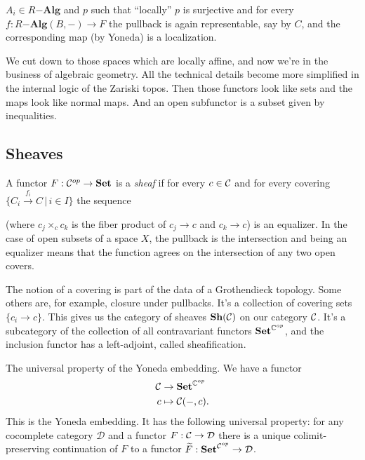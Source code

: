 \documentclass[class=report, crop=false,a4paper,twoside]{standalone}
\begin{document}
$A_i \in R\mathbf{-Alg}$ and $p$ such that ``locally'' $p$ is surjective and for every $f: R\mathbf{-Alg}(B,-) \to F$ the pullback is again representable, say by $C$, and the corresponding map (by Yoneda) is a localization.

We cut down to those spaces which are locally affine, and now we're in the business of algebraic geometry. All the technical details become more simplified in the internal logic of the Zariski topos. Then those functors look like sets and the maps look like normal maps. And an open subfunctor is a subset given by inequalities.

\subsection{Sheaves}
A functor $F: \mathcal{C}^{op} \to \mathbf{Set}$ is a \emph{sheaf} if for every $c \in \mathcal{C}$ and for every covering $\{C_i \xrightarrow{f_i} C \,|\, i \in I\}$ the sequence
\begin{center}
	(where $c_j \times_c c_k$ is the fiber product of $c_j \to c$ and $c_k \to c$) is an equalizer. In the case of open subsets of a space $X$, the pullback is the intersection and being an equalizer means that the function agrees on the intersection of any two open covers. 
\end{center}

The notion of a covering is part of the data of a Grothendieck topology. Some others are, for example, closure under pullbacks. It's a collection of covering sets $\{c_i \to c\}$. This gives us the category of sheaves $\mathbf{Sh}(\mathcal{C})$ on our category $\mathcal{C}$. It's a subcategory of the collection of all contravariant functors $\mathbf{Set}^{\mathbb{C}^{op}}$, and the inclusion functor has a left-adjoint, called sheafification.

The universal property of the Yoneda embedding. We have a functor
\begin{align*}
	\mathcal{C} &\to \mathbf{Set}^{\mathbb{C}^{op}}\\
	c &\mapsto \mathcal{C}(-,c).
\end{align*}
This is the Yoneda embedding. It has the following universal property: for any cocomplete category $\mathcal{D}$ and a functor $F: \mathcal{C} \to \mathcal{D}$ there is a unique colimit-preserving continuation of $F$ to a functor $\widetilde{F}: \mathbf{Set}^{\mathcal{C}^{op}} \to \mathcal{D}$.
\end{document}
